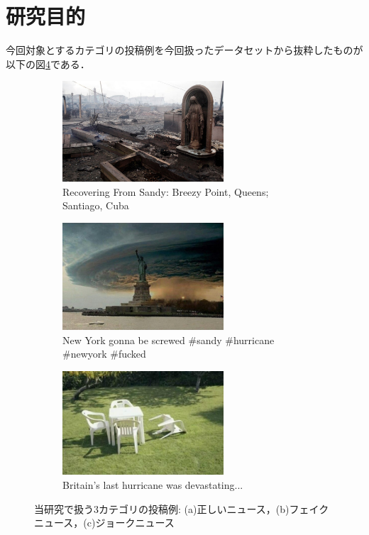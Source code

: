 \section{研究目的}
\label{ch:purpose}
%
今回対象とするカテゴリの投稿例を今回扱ったデータセットから抜粋したものが以下の図\ref{fig:examples}である．

\begin{figure}[ht]
    \centering
    \begin{subfigure}[b]{0.4\textwidth}
        \includegraphics[width=6cm]{images/real_example.jpg}
        \caption{Recovering From Sandy: Breezy Point, Queens; Santiago, Cuba}
        \label{fig:real}
    \end{subfigure}
    \hfill %
    \begin{subfigure}[b]{0.4\textwidth}
        \includegraphics[width=6cm]{images/fake_example.jpg}
        \caption{New York gonna be screwed \#sandy \#hurricane \#newyork \#fucked}
        \label{fig:fake}
    \end{subfigure}
    \hfill %
    \begin{subfigure}[b]{0.4\textwidth}
        \includegraphics[width=6cm]{images/humor_example.jpg}
        \caption{Britain's last hurricane was devastating...}
        \label{fig:humor}
    \end{subfigure}
    \caption{当研究で扱う3カテゴリの投稿例: (a)正しいニュース，(b)フェイクニュース，(c)ジョークニュース}
    \label{fig:examples}
\end{figure}

